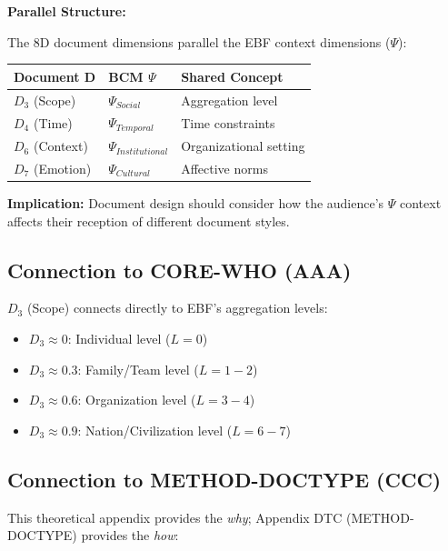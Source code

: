\begin{tcolorbox}[colback=yellow!5!white, colframe=yellow!75!black,
    title=Integration: REF-DOCTYPE $\leftrightarrow$ CORE-WHEN]

\textbf{Parallel Structure:}

The 8D document dimensions parallel the EBF context dimensions ($\Psi$):

\begin{center}
\begin{tabular}{lll}
\textbf{Document D} & \textbf{BCM $\Psi$} & \textbf{Shared Concept} \\
\midrule
$D_3$ (Scope) & $\Psi_{Social}$ & Aggregation level \\
$D_4$ (Time) & $\Psi_{Temporal}$ & Time constraints \\
$D_6$ (Context) & $\Psi_{Institutional}$ & Organizational setting \\
$D_7$ (Emotion) & $\Psi_{Cultural}$ & Affective norms \\
\end{tabular}
\end{center}

\textbf{Implication:} Document design should consider how the audience's
$\Psi$ context affects their reception of different document styles.

\end{tcolorbox}

\subsection{Connection to CORE-WHO (AAA)}

$D_3$ (Scope) connects directly to EBF's aggregation levels:

\begin{itemize}[nosep]
\item $D_3 \approx 0$: Individual level ($L = 0$)
\item $D_3 \approx 0.3$: Family/Team level ($L = 1-2$)
\item $D_3 \approx 0.6$: Organization level ($L = 3-4$)
\item $D_3 \approx 0.9$: Nation/Civilization level ($L = 6-7$)
\end{itemize}

\subsection{Connection to METHOD-DOCTYPE (CCC)}

This theoretical appendix provides the \textit{why};
Appendix DTC (METHOD-DOCTYPE) provides the \textit{how}:

